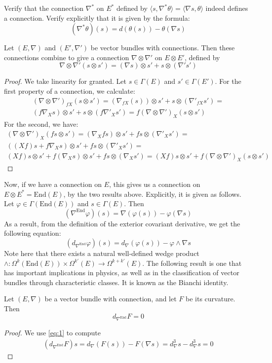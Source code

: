 \begin{exercise}
  Verify that the connection $\nabla^*$ on $E^*$ defined by $\langle s,\nabla^*\theta\rangle=\langle\nabla s,\theta\rangle$ indeed defines a connection. Verify explicitly that it is given by the formula:
  $$(\nabla^*\theta)(s)=d(\theta(s))-\theta(\nabla s)$$
\end{exercise}
\begin{proposition}
  Let $(E,\nabla)$ and $(E',\nabla')$ be vector bundles with connections. Then these connections combine to give a connection $\nabla\otimes\nabla'$ on $E\otimes E'$, defined by 
  $$\nabla\otimes\nabla'(s\otimes s')=(\nabla s)\otimes s'+s\otimes(\nabla's')$$
\end{proposition}
\begin{proof}
  We take linearity for granted. Let $s\in\Gamma(E)$ and $s'\in\Gamma(E')$. For the first property of a connection, we calculate:
  \begin{align*}
    (\nabla\otimes\nabla')_{fX}(s\otimes s')=(\nabla_{fX}(s))\otimes s'+s\otimes(\nabla'_{fX} s')=\\
    (f\nabla_Xs)\otimes s'+s\otimes(f\nabla'_Xs')=f(\nabla\otimes\nabla')_X(s\otimes s')
  \end{align*}
  For the second, we have:
  \begin{align*}
    (\nabla\otimes\nabla')_X(fs\otimes s')=(\nabla_Xfs)\otimes s'+fs\otimes(\nabla'_Xs')=\\
    ((Xf)s+f\nabla_Xs)\otimes s'+fs\otimes(\nabla'_Xs')=\\
    (Xf)s\otimes s'+f(\nabla_Xs)\otimes s'+fs\otimes(\nabla_Xs')=(Xf)s\otimes s'+f(\nabla\otimes\nabla')_X(s\otimes s')
  \end{align*}
\end{proof}
Now, if we have a connection on $E$, this gives us a connection on $E\otimes E^*=\text{End}(E)$, by the two results above. Explicitly, it is given as follows. Let $\varphi\in\Gamma(\text{End}(E))$ and $s\in\Gamma(E)$. Then
$$(\nabla^\text{End}\varphi)(s)=\nabla(\varphi(s))-\varphi(\nabla s)$$
As a result, from the definition of the exterior covariant derivative, we get the following equation:
\begin{equation}\label{eq:1}
  (d_{\nabla^\text{End}}\varphi)(s)=d_\nabla(\varphi(s))-\varphi\wedge\nabla s
\end{equation}
Note here that there exists a natural well-defined wedge product $\wedge:\Omega^k(\text{End}(E))\times\Omega^{k'}(E)\to\Omega^{k+k'}(E)$.
The following result is one that has important implications in physics, as well as in the classification of vector bundles through characteristic classes. It is known as the Bianchi identity.
\begin{theorem}
  Let $(E,\nabla)$ be a vector bundle with connection, and let $F$ be its curvature. Then
  $$d_{\nabla^\text{End}}F=0$$
\end{theorem}
\begin{proof}
  We use \ref{eq:1} to compute
  \begin{align*}
    (d_{\nabla^\text{End}}F)s=d_\nabla(F(s))-F(\nabla s)=d_\nabla^3s-d_\nabla^3s=0
  \end{align*}
\end{proof}
